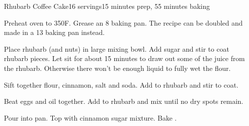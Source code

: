 \documentclass[../Cookbook.tex]{subfiles}
\begin{document}
\begin{recipe}{Rhubarb Coffee Cake}{16 servings}{15 minutes prep, 55 minutes baking}

	Preheat oven to 350\0F. Grease an 8 baking pan. The recipe can be doubled and made in a 13 baking pan instead.

	Place rhubarb (and nuts) in large mixing bowl.  Add sugar and stir to coat rhubarb pieces.
	Let sit for about 15 minutes to draw out some of the juice from the rhubarb. Otherwise there won't be enough liquid to fully wet the flour.

	Sift together flour, cinnamon, salt and soda.  Add to rhubarb and stir to coat.

	Beat eggs and oil together.  Add to rhubarb and mix until no dry spots remain.

	Pour into pan. Top with cinnamon sugar mixture. Bake .
\end{recipe}
\end{document}
